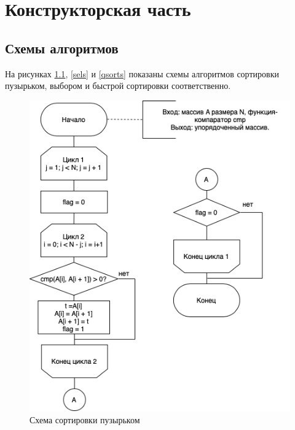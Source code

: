 \documentclass{report}
\begin{document}
\clearpage

\chapter{Конструкторская часть}

\section{Схемы алгоритмов}

На рисунках \ref{bubs}, \ref{sels} и \ref{qsorts} показаны схемы алгоритмов сортировки пузырьком, выбором и быстрой сортировки соответственно.

\begin{figure}[h!p]
	\centering
	\includegraphics[scale = 0.75]{bsort.png}
	\caption{Схема сортировки пузырьком}
	\label{bubs}
\end{figure}
\end{document}
